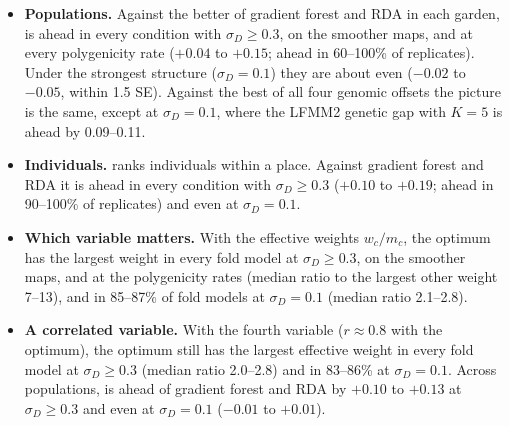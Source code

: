\begin{itemize}
\item \textbf{Populations.} Against the better of gradient forest and RDA
  in each garden, \ecolocator is ahead in every condition with
  $\sigma_D \geq 0.3$, on the smoother maps, and at every polygenicity
  rate ($+0.04$ to $+0.15$; ahead in 60--100\% of replicates). Under the
  strongest structure ($\sigma_D=0.1$) they are about even ($-0.02$ to
  $-0.05$, within 1.5 SE). Against the best of all four genomic offsets
  the picture is the same, except at $\sigma_D=0.1$, where the LFMM2
  genetic gap with $K=5$ is ahead by 0.09--0.11.
\item \textbf{Individuals.} \ecolocator ranks individuals within a place.
  Against gradient forest and RDA it is ahead in every condition with
  $\sigma_D \geq 0.3$ ($+0.10$ to $+0.19$; ahead in 90--100\% of
  replicates) and even at $\sigma_D=0.1$.
\item \textbf{Which variable matters.} With the effective weights
  $w_c/m_c$, the optimum has the largest weight in every fold model at
  $\sigma_D \geq 0.3$, on the smoother maps, and at the polygenicity rates
  (median ratio to the largest other weight 7--13), and in 85--87\% of fold
  models at $\sigma_D=0.1$ (median ratio 2.1--2.8).
\item \textbf{A correlated variable.} With the fourth variable
  ($r \approx 0.8$ with the optimum), the optimum still has the largest
  effective weight in every fold model at $\sigma_D \geq 0.3$ (median ratio
  2.0--2.8) and in 83--86\% at $\sigma_D=0.1$. Across populations,
  \ecolocator is ahead of gradient forest and RDA by $+0.10$ to $+0.13$ at
  $\sigma_D \geq 0.3$ and even at $\sigma_D=0.1$ ($-0.01$ to $+0.01$).
\end{itemize}

